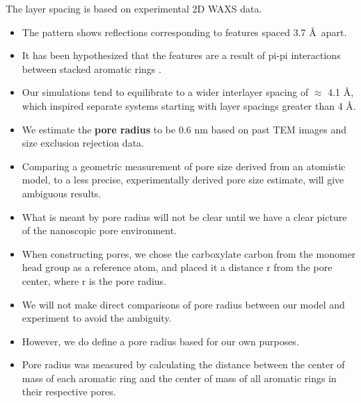 \documentclass{article}
\newcommand{\angstrom}{\textup{\AA}}
\begin{document}
  The layer spacing is based on experimental 2D WAXS data.
  \begin{itemize}  
    \item The pattern shows reflections corresponding to features spaced 3.7 \angstrom~apart.
    \item It has been hypothesized that the features are a result of pi-pi
    interactions between stacked aromatic rings \cite{feng_scalable_2014}. 
    \item Our simulations tend to equilibrate to a wider interlayer spacing of
    $\approx$ 4.1 \angstrom, which inspired separate systems starting with layer 
    spacings greater than 4 \angstrom.
  \end{itemize}
    
  \begin{itemize}
    \item We estimate the \textbf{pore radius} to be 0.6 nm based on past TEM images 
    and size exclusion rejection data\cite{feng_scalable_2014,feng_thin_2016,
    zhou_supported_2005}.
    \item Comparing a geometric measurement of pore size derived from an 
    atomistic model, to a less precise, experimentally derived pore size estimate,
    will give ambiguous results.
    \item What is meant by pore radius will not be clear until we have a clear picture
    of the nanoscopic pore environment.
    \item When constructing pores, we chose the carboxylate carbon from the monomer
    head group as a reference atom, and placed it a distance r from the pore center,
    where r is the pore radius.  %
    \item We will not make direct comparisons of pore radius between our model 
    and experiment to avoid the ambiguity. 
    \item However, we do define a pore radius based for our own purposes.
    \item Pore radius was measured by calculating the distance between the center of 
    mass of each aromatic ring and the center of mass of all aromatic rings in their 
    respective pores.
  \end{itemize}
  
\end{document}
